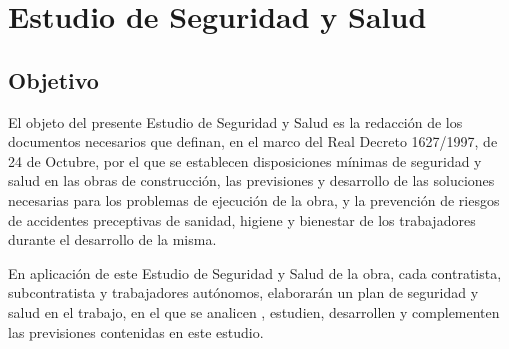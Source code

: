 \chapter{Estudio de Seguridad y Salud}
\label{ch:sys}
\section{Objetivo}
\label{sec:sys-objetivo}
El objeto del presente Estudio de Seguridad y Salud es la redacción de los documentos necesarios que definan, en el marco del Real Decreto 1627/1997, de 24 de Octubre, por el que se establecen disposiciones mínimas de seguridad y salud en las obras de construcción, las previsiones y desarrollo de las soluciones necesarias para los problemas de ejecución de la obra, y la prevención de riesgos de accidentes preceptivas de sanidad, higiene y bienestar de los trabajadores durante el desarrollo de la misma.
	
En aplicación de este Estudio de Seguridad y Salud de la obra, cada contratista, subcontratista y trabajadores autónomos, elaborarán un plan de seguridad y salud en el trabajo, en el que se analicen , estudien, desarrollen y complementen las previsiones contenidas en este estudio.
